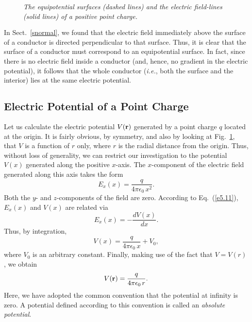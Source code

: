 \begin{figure}[h]
\epsfysize=2.5in
\centerline{}
\caption{\em The equipotential surfaces (dashed lines) and the electric
field-lines (solid lines) of a positive point charge.}\label{f5.4}
\end{figure}

In Sect.~\ref{snormal}, we found that the electric field immediately above the surface of
a conductor is directed perpendicular to that surface. Thus, it is clear that the
surface of a conductor must correspond to an equipotential surface. In fact, since there
is no electric field inside a conductor (and, hence, no gradient in the electric
potential), it follows that the whole conductor ({\em i.e.}, both the surface and the
interior)  lies at the same electric potential. 

\subsection{Electric Potential of a Point Charge}
Let us calculate the electric potential $V({\bf r})$ generated by a point charge $q$ located at
the origin. It is fairly obvious, by symmetry, and also by looking at Fig.~\ref{f5.4}, that
 $V$ is a
function of  $r$ only, where $r$ is the radial distance 
from the origin. Thus, without loss of generality, we can restrict our
investigation to the
potential $V(x)$ generated  along the positive $x$-axis. The $x$-component of the electric
field generated along this axis takes the form 
\begin{equation}
E_x(x)= \frac{q}{4\pi\epsilon_0\,x^2}.
\end{equation}
 Both the
$y$- and $z$-components of the field are zero. According to Eq.~(\ref{e5.11}), $E_x(x)$ and
$V(x)$ are related via 
\begin{equation}
E_x(x) = - \frac{dV(x)}{dx}.
\end{equation}
Thus, by integration,
\begin{equation}
V(x)= \frac{q}{4\pi\epsilon_0\,x} + V_0,
\end{equation}
where $V_0$ is an arbitrary constant. Finally, making use of the
fact that $V = V(r)$, we obtain
\begin{equation}\label{e5.22}
V({\bf r}) = \frac{q}{4\pi\epsilon_0\,r}.
\end{equation}
Here, we have adopted the common convention that the potential at infinity
is zero. A potential defined according to this convention is  called
an {\em absolute potential}.

